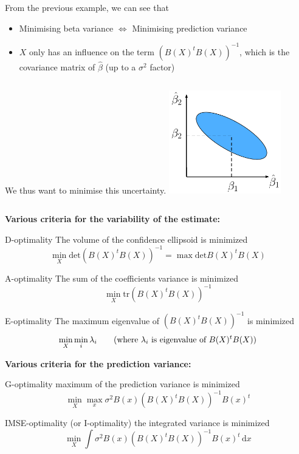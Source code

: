 \documentclass{beamer}
\newcommand\dx{\, \mathrm{d}}
\begin{document}
\begin{frame}{}
From the previous example, we can see that 
\begin{itemize}
	\item Minimising beta variance $\Leftrightarrow$ Minimising prediction variance
	\item $X$ only has an influence on the term $(B(X)^t B(X))^{-1}$, which is the covariance matrix of $\hat{\beta}$ (up to a $\sigma^2$ factor)
\end{itemize}
\vspace{5mm}
\begin{columns}[c]
\column{3cm}
We thus want to minimise this uncertainty.
\column{5cm}
\includegraphics[height=4.5cm]{figures/latexdraw/optimalDoEreg}
\end{columns}
\end{frame}

\begin{frame}{}
\textbf{Various criteria for the variability of the estimate:}
\begin{block}{D-optimality}
	The volume of the confidence ellipsoid is minimized
	$$ \min_X \mathrm{det} (B(X)^t B(X))^{-1} = \max \mathrm{det} B(X)^t B(X)$$
\end{block}
\begin{block}{A-optimality}
	The sum of the coefficients variance is minimized
	$$ \min_X \mathrm{tr} (B(X)^t B(X))^{-1} $$
\end{block}
\begin{block}{E-optimality}
	The maximum eigenvalue of $(B(X)^t B(X))^{-1}$ is minimized
	$$ \min_X \min_i \lambda_i \text{\qquad (where $\lambda_i$ is eigenvalue of $B(X)^t B(X))$}$$
\end{block}
\end{frame}

\begin{frame}{}
\textbf{Various criteria for the prediction variance:}
\begin{block}{G-optimality}
	maximum of the prediction variance is minimized
	$$ \min_X \max_x \sigma^2 B(x) (B(X)^t B(X))^{-1} B(x)^t$$
\end{block}
\begin{block}{IMSE-optimality (or I-optimality)}
	the integrated variance is minimized
	$$ \min_X \int \sigma^2 B(x) (B(X)^t B(X))^{-1} B(x)^t \dx x$$
\end{block}
\end{frame}
\end{document}
